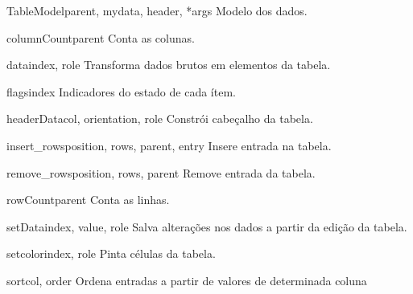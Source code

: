 \documentclass[letterpaper,10pt,portuguese]{manual}
\begin{document}
\hypertarget{veliger.TableModel}{}\begin{classdesc}{TableModel}{parent, mydata, header, *args}
Modelo dos dados.

\hypertarget{veliger.TableModel.columnCount}{}\begin{methoddesc}{columnCount}{parent}
Conta as colunas.
\end{methoddesc}

\hypertarget{veliger.TableModel.data}{}\begin{methoddesc}{data}{index, role}
Transforma dados brutos em elementos da tabela.
\end{methoddesc}

\hypertarget{veliger.TableModel.flags}{}\begin{methoddesc}{flags}{index}
Indicadores do estado de cada ítem.
\end{methoddesc}

\hypertarget{veliger.TableModel.headerData}{}\begin{methoddesc}{headerData}{col, orientation, role}
Constrói cabeçalho da tabela.
\end{methoddesc}

\hypertarget{veliger.TableModel.insert\_rows}{}\begin{methoddesc}{insert\_rows}{position, rows, parent, entry}
Insere entrada na tabela.
\end{methoddesc}

\hypertarget{veliger.TableModel.remove\_rows}{}\begin{methoddesc}{remove\_rows}{position, rows, parent}
Remove entrada da tabela.
\end{methoddesc}

\hypertarget{veliger.TableModel.rowCount}{}\begin{methoddesc}{rowCount}{parent}
Conta as linhas.
\end{methoddesc}

\hypertarget{veliger.TableModel.setData}{}\begin{methoddesc}{setData}{index, value, role}
Salva alterações nos dados a partir da edição da tabela.
\end{methoddesc}

\hypertarget{veliger.TableModel.setcolor}{}\begin{methoddesc}{setcolor}{index, role}
Pinta células da tabela.
\end{methoddesc}

\hypertarget{veliger.TableModel.sort}{}\begin{methoddesc}{sort}{col, order}
Ordena entradas a partir de valores de determinada coluna
\end{methoddesc}
\end{classdesc}
\end{document}
